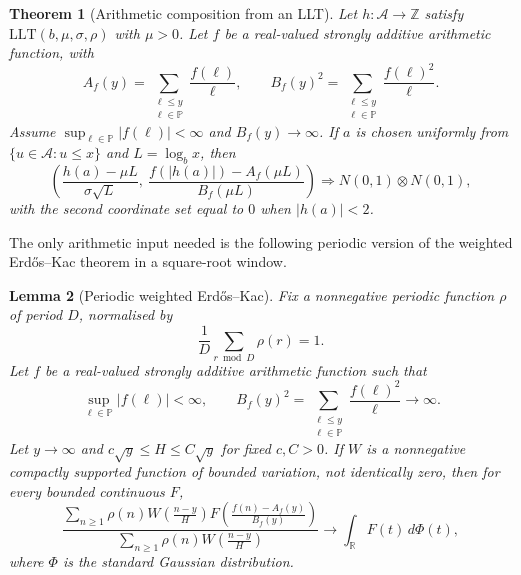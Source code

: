 \documentclass[11pt,reqno]{amsart}
\theoremstyle{plain}
\newtheorem{theorem}{Theorem}[section]
\newtheorem{lemma}[theorem]{Lemma}
\theoremstyle{definition}
\newcommand{\Z}{\mathbb{Z}}
\newcommand{\R}{\mathbb{R}}
\newcommand{\Pp}{\mathbb{P}}
\newcommand{\1}{\mathbf 1}
\begin{document}
\begin{theorem}[Arithmetic composition from an LLT]\label{thm:llt-composition}
Let $h:\mathcal A\to\Z$ satisfy $\mathrm{LLT}(b,\mu,\sigma,\rho)$ with $\mu>0$.  Let $f$ be a real-valued strongly additive arithmetic function, with
\[
 A_f(y)=\sum_{\substack{\ell\le y\\\ell\in\Pp}}\frac{f(\ell)}\ell,
 \qquad
 B_f(y)^2=\sum_{\substack{\ell\le y\\\ell\in\Pp}}\frac{f(\ell)^2}\ell.
\]
Assume $\sup_{\ell\in\Pp}|f(\ell)|<\infty$ and $B_f(y)\to\infty$.  If $a$ is chosen uniformly from $\{u\in\mathcal A:u\le x\}$ and $L=\log_bx$, then
\begin{equation}\label{eq:abstract-ek}
 \left(
 \frac{h(a)-\mu L}{\sigma\sqrt L},\
 \frac{f(|h(a)|)-A_f(\mu L)}{B_f(\mu L)}
 \right)
 \Longrightarrow N(0,1)\otimes N(0,1),
\end{equation}
with the second coordinate set equal to $0$ when $|h(a)|<2$.
\end{theorem}

The only arithmetic input needed is the following periodic version of the weighted Erd\H{o}s--Kac theorem in a square-root window.

\begin{lemma}[Periodic weighted Erd\H{o}s--Kac]\label{lem:weighted-ek}
Fix a nonnegative periodic function $\rho$ of period $D$, normalised by
\[
 \frac1D\sum_{r\bmod D}\rho(r)=1.
\]
Let $f$ be a real-valued strongly additive arithmetic function such that
\[
 \sup_{\ell\in\Pp}|f(\ell)|<\infty,
 \qquad B_f(y)^2=\sum_{\substack{\ell\le y\\ \ell\in\Pp}}\frac{f(\ell)^2}\ell\longrightarrow\infty.
\]
Let $y\to\infty$ and $c\sqrt y\le H\le C\sqrt y$ for fixed $c,C>0$.  If $W$ is a nonnegative compactly supported function of bounded variation, not identically zero, then for every bounded continuous $F$,
\begin{equation}\label{eq:weighted-ek-general}
 \frac{\displaystyle
 \sum_{n\ge1}\rho(n)W\!\left(\frac{n-y}{H}\right)
 F\!\left(\frac{f(n)-A_f(y)}{B_f(y)}\right)}
 {\displaystyle
 \sum_{n\ge1}\rho(n)W\!\left(\frac{n-y}{H}\right)}
 \longrightarrow \int_{\R}F(t)\,d\Phi(t),
\end{equation}
where $\Phi$ is the standard Gaussian distribution.
\end{lemma}
\end{document}
